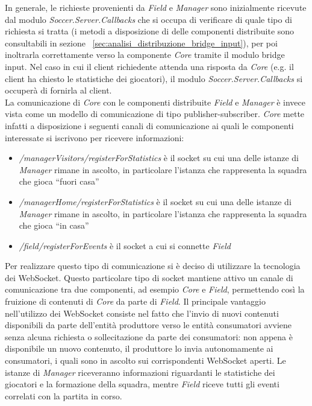 In generale, le richieste provenienti da \emph{Field} e \emph{Manager} sono inizialmente ricevute dal modulo \emph{Soccer.Server.Callbacks} che si occupa di verificare di quale tipo di richiesta si tratta (i metodi a disposizione di delle componenti distribuite sono consultabili in sezione ~\ref{sec:analisi_distribuzione_bridge_input}), per poi inoltrarla correttamente verso la componente \emph{Core} tramite il modulo bridge input. Nel caso in cui il client richiedente attenda una risposta da \emph{Core} (e.g. il client ha chiesto le statistiche dei giocatori), il modulo \emph{Soccer.Server.Callbacks} si occuper\`{a} di fornirla al client.\\

La comunicazione di \emph{Core} con le componenti distribuite \emph{Field} e \emph{Manager} \`{e} invece vista come un modello di comunicazione di tipo publisher-subscriber. \emph{Core} mette infatti a disposizione i seguenti canali di comunicazione ai quali le componenti interessate si iscrivono per ricevere informazioni:

\begin{itemize}
	\item \emph{/managerVisitors/registerForStatistics} \`{e} il socket su cui una delle istanze di \emph{Manager} rimane in ascolto, in particolare l'istanza che rappresenta la squadra che gioca ``fuori casa''
	\item \emph{/managerHome/registerForStatistics} \`{e} il socket su cui una delle istanze di \emph{Manager} rimane in ascolto, in particolare l'istanza che rappresenta la squadra che gioca ``in casa''
	\item \emph{/field/registerForEvents} \`{e} il socket a cui si connette \emph{Field}
\end{itemize}

\noindent Per realizzare questo tipo di comunicazione si è deciso di utilizzare la tecnologia dei WebSocket. Questo particolare tipo di socket mantiene attivo un canale di comunicazione tra due componenti, ad esempio \emph{Core} e \emph{Field}, permettendo cos\`{i} la fruizione di contenuti di \emph{Core} da parte di \emph{Field}. Il principale vantaggio nell'utilizzo dei WebSocket consiste nel fatto che l'invio di nuovi contenuti disponibili da parte dell'entit\`{a} produttore verso le entit\`{a} consumatori avviene senza alcuna richiesta o sollecitazione da parte dei consumatori: non appena \`{e} disponibile un nuovo contenuto, il produttore lo invia autonomamente ai consumatori, i quali sono in ascolto sui corrispondenti WebSocket aperti. Le istanze di \emph{Manager} riceveranno informazioni riguardanti le statistiche dei giocatori e la formazione della squadra, mentre \emph{Field} riceve tutti gli eventi correlati con la partita in corso.\\

